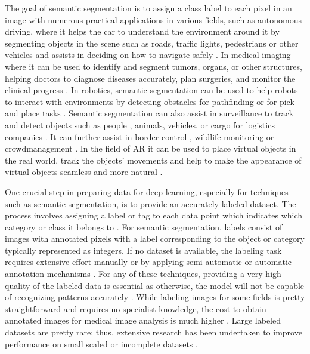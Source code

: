 The goal of semantic segmentation is to assign a class label to each pixel in an image with numerous practical applications in various fields, such as autonomous driving, where it helps the car to understand the environment around it by segmenting objects in the scene such as roads, traffic lights, pedestrians or other vehicles and assists in deciding on how to navigate \cite{siam2018comparative} safely \cite{blum2019fishyscapes}\cite{chen2017importance}\cite{zhou2019automated}. In medical imaging where it can be used to identify and segment tumors, organs, or other structures, helping doctors to diagnose diseases accurately, plan surgeries, and monitor the clinical progress \cite{asgari2021deep}\cite{rezaei2018conditional}\cite{madani2020artificial}. In robotics, semantic segmentation can be used to help robots to interact with environments by detecting obstacles for pathfinding or for pick and place tasks \cite{milioto2018real}\cite{milioto2019bonnet}\cite{wada2019joint}. Semantic segmentation can also assist in surveillance to track and detect objects such as people \cite{jung2001content}, animals, vehicles, or cargo for logistics companies \cite{cane2018evaluating}. It can further assist in border control \cite{balado2019road}\cite{wang2022deep}, wildlife monitoring \cite{haucke2021exploiting} or crowdmanagement \cite{wan2021fine}. In the field of \acf{AR} it can be used to place virtual objects in the real world, track the objects' movements and help to make the appearance of virtual objects seamless and more natural \cite{tanzi2021real}\cite{ko2020novel}.

One crucial step in preparing data for deep learning, especially for techniques such as semantic segmentation, is to provide an accurately labeled dataset. The process involves assigning a label or tag to each data point which indicates which category or class it belongs to \cite{YU201882}. For semantic segmentation, labels consist of images with annotated pixels with a label corresponding to the object or category typically represented as integers. If no dataset is available, the labeling task requires extensive effort manually or by applying semi-automatic or automatic annotation mechanisms \cite{rapson2018reducing}\cite{sager2021survey}. For any of these techniques, providing a very high quality of the labeled data is essential as otherwise, the model will not be capable of recognizing patterns accurately \cite{alonso2015challenges}\cite{https://doi.org/10.48550/arxiv.2103.14749}. While labeling images for some fields is pretty straightforward and requires no specialist knowledge, the cost to obtain annotated images for medical image analysis is much higher \cite{willemink2020preparing}. Large labeled datasets are pretty rare; thus, extensive research has been undertaken to improve performance on small scaled or incomplete datasets \cite{Zhang2018}\cite{Barz_2020_WACV}\cite{10.1145/2818346.2830593}\cite{WANG2021102579}\cite{8693644}.

